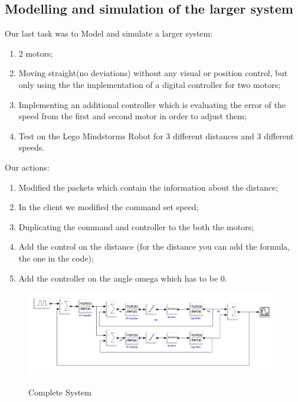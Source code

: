 \documentclass[a4paper,12pt,oneside]{article}
\begin{document}
\begin{enumerate}
\section{Modelling and simulation of the larger system}
Our last task was to Model and simulate a larger system:
\begin{enumerate} 
\item 2 motors;
\item Moving straight(no deviations) without any visual or position control, but only using the the implementation of a digital controller for two motors;
\item Implementing an additional controller which is evaluating the error of the speed from the first and second motor in order to adjust them;
\item Test on the Lego Mindstorms Robot for 3 different distances and 3 different speeds.
\end{enumerate} 
Our actions:
\begin{enumerate} 
\item Modified the packets which contain the information about the distance;
\item In the client we modified the command set speed;
\item Duplicating the command and controller to the both the motors;
\item Add the control on the distance (for the distance you can add the formula, the one in the code);
\item Add the controller on the angle omega which has to be 0.

\end{enumerate} 


\begin{figure} [h]%
	\centering
	\includegraphics[width=\columnwidth]{completesystem.png}
	\label{fig:completesystem}
	\caption{Complete System} %
\end{figure}



\end{enumerate}
\end{document}

